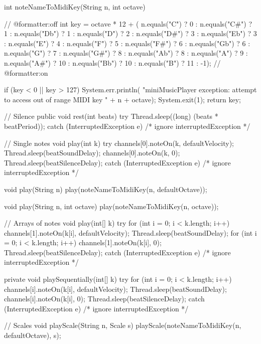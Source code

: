 \begin{codeblock}
{  int noteNameToMidiKey(String n, int octave) {
 // @formatter:off
 int key = octave * 12 + 
        ( n.equals("C") ? 0
        : n.equals("C#") ? 1
        : n.equals("Db") ? 1
        : n.equals("D") ? 2
        : n.equals("D#") ? 3
        : n.equals("Eb") ? 3
        : n.equals("E") ? 4
        : n.equals("F") ? 5
        : n.equals("F#") ? 6
        : n.equals("Gb") ? 6
        : n.equals("G") ? 7
        : n.equals("G#") ? 8
        : n.equals("Ab") ? 8
        : n.equals("A") ? 9  
        : n.equals("A#") ? 10 
        : n.equals("Bb") ? 10 
        : n.equals("B") ? 11 
        : -1);
 // @formatter:on   

    if (key < 0 || key > 127) {
      System.err.println(
        "miniMusicPlayer exception: attempt to access out of range MIDI key "
         + n + octave);
      System.exit(1);
    }
    return key;
  }

  // Silence
  public void rest(int beats) {
    try {
      Thread.sleep((long) (beats * beatPeriod));
    } catch (InterruptedException e) {
      /* ignore interruptedException */ }
  }

  // Single notes
  void play(int k) {
    try {
      channels[0].noteOn(k, defaultVelocity);
      Thread.sleep(beatSoundDelay);
      channels[0].noteOn(k, 0);
      Thread.sleep(beatSilenceDelay);
    } catch (InterruptedException e) {
      /* ignore interruptedException */ }
  }

  void play(String n) {
    play(noteNameToMidiKey(n, defaultOctave));
  }

  void play(String n, int octave) {
    play(noteNameToMidiKey(n, octave));
  }

  // Arrays of notes
  void play(int[] k) {
    try {
      for (int i = 0; i < k.length; i++)
        channels[1].noteOn(k[i], defaultVelocity);
      Thread.sleep(beatSoundDelay);
      for (int i = 0; i < k.length; i++)
        channels[1].noteOn(k[i], 0);
      Thread.sleep(beatSilenceDelay);
    } catch (InterruptedException e) {
      /* ignore interruptedException */ }
  }

  private void playSequentially(int[] k) {
    try {
      for (int i = 0; i < k.length; i++) {
        channels[i].noteOn(k[i], defaultVelocity);
        Thread.sleep(beatSoundDelay);
        channels[i].noteOn(k[i], 0);
        Thread.sleep(beatSilenceDelay);
      }
    } catch (InterruptedException e) {
      /* ignore interruptedException */ }
  }

  // Scales
  void playScale(String n, Scale s) {
    playScale(noteNameToMidiKey(n, defaultOctave), s);
  }

}
\end{codeblock}
